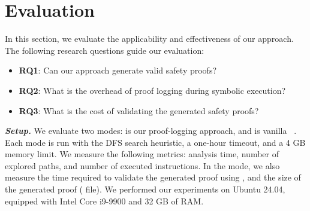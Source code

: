 \section{Evaluation}
\label{sec:evaluation}

In this section, we evaluate the applicability and effectiveness of our approach.
The following research questions guide our evaluation:
\begin{itemize}
    \item \textbf{RQ1}: Can our approach generate valid safety proofs?
    \item \textbf{RQ2}: What is the overhead of proof logging during symbolic execution?
    \item \textbf{RQ3}: What is the cost of validating the generated safety proofs?
\end{itemize}

\textbf{\textit{Setup.}}
We evaluate two modes:
\proofopt is our proof-logging approach, and \base is vanilla \klee~\cite{klee}.
Each mode is run with the DFS search heuristic, a one-hour timeout, and a 4 GB memory limit.
We measure the following metrics:
analysis time, number of explored paths, and number of executed instructions.
In the \proofopt mode,
we also measure the time required to validate the generated proof using \coqc,
and the size of the generated proof ( file).
We performed our experiments on Ubuntu 24.04,
equipped with Intel Core i9-9900 and 32 GB of RAM.

